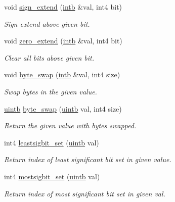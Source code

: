 \begin{DoxyCompactItemize}
void \mbox{\hyperlink{address_8hh_abe0bd95db53e851e047b8273ba4fb59f}{sign\+\_\+extend}} (\mbox{\hyperlink{types_8h_aa925ba3e627c2df89d5b1cfe84fb8572}{intb}} \&val, int4 bit)
\begin{DoxyCompactList}\small\item\em Sign extend above given bit. \end{DoxyCompactList}\item 
void \mbox{\hyperlink{address_8hh_a953743448335ea450cbc58349ce1f0cf}{zero\+\_\+extend}} (\mbox{\hyperlink{types_8h_aa925ba3e627c2df89d5b1cfe84fb8572}{intb}} \&val, int4 bit)
\begin{DoxyCompactList}\small\item\em Clear all bits above given bit. \end{DoxyCompactList}\item 
void \mbox{\hyperlink{address_8hh_aedcacdf1dd5af3b58d59d76b8011d0f1}{byte\+\_\+swap}} (\mbox{\hyperlink{types_8h_aa925ba3e627c2df89d5b1cfe84fb8572}{intb}} \&val, int4 size)
\begin{DoxyCompactList}\small\item\em Swap bytes in the given value. \end{DoxyCompactList}\item 
\mbox{\hyperlink{types_8h_a2db313c5d32a12b01d26ac9b3bca178f}{uintb}} \mbox{\hyperlink{address_8hh_ad080ab6270827c2a718582d0345d93a4}{byte\+\_\+swap}} (\mbox{\hyperlink{types_8h_a2db313c5d32a12b01d26ac9b3bca178f}{uintb}} val, int4 size)
\begin{DoxyCompactList}\small\item\em Return the given value with bytes swapped. \end{DoxyCompactList}\item 
int4 \mbox{\hyperlink{address_8hh_ac4d874e14dba4c4dabbbdc0a15653755}{leastsigbit\+\_\+set}} (\mbox{\hyperlink{types_8h_a2db313c5d32a12b01d26ac9b3bca178f}{uintb}} val)
\begin{DoxyCompactList}\small\item\em Return index of least significant bit set in given value. \end{DoxyCompactList}\item 
int4 \mbox{\hyperlink{address_8hh_aa894bdd40ffc8c7a6237e49062c62177}{mostsigbit\+\_\+set}} (\mbox{\hyperlink{types_8h_a2db313c5d32a12b01d26ac9b3bca178f}{uintb}} val)
\begin{DoxyCompactList}\small\item\em Return index of most significant bit set in given val. \end{DoxyCompactList}\item 

\end{DoxyCompactItemize}
